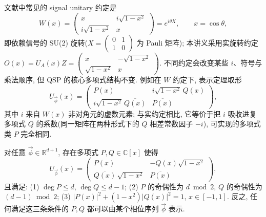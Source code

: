 \documentclass[utf8]{article} %
\numberwithin{equation}{section}   %
\newtheorem{Thm}{\hskip 2em {\color{blue} 定理}}[subsection]
\newtheorem{Note}{\hskip 2em {\color{red} 注}}[subsection]
\begin{document}
\begin{Note}
    文献中常见的 signal unitary 约定是
    \begin{equation}
        W(x) = \begin{pmatrix} x & i\sqrt{1-x^2} \\ i\sqrt{1-x^2} & x \end{pmatrix}
        = e^{i\theta X}, \qquad x = \cos\theta,
    \end{equation}
    即依赖信号的 SU(2) 旋转($X = \begin{pmatrix} 0 & 1 \\ 1 & 0 \end{pmatrix}$ 为 Pauli 矩阵);
    本讲义采用实旋转约定 $O(x) = U_A(x)Z = \begin{pmatrix} x & -\sqrt{1-x^2} \\ \sqrt{1-x^2} & x \end{pmatrix}$.
    不同约定会改变某些 $i$、符号与乘法顺序, 但 QSP 的核心多项式结构不变.
    例如在 $W$ 约定下, 表示定理取形
    \begin{equation}
        U_{\vec\phi}(x) = \begin{pmatrix} P(x) & i\sqrt{1-x^2}\,Q(x) \\
            i\sqrt{1-x^2}\,\overline{Q(x)} & \overline{P(x)} \end{pmatrix},
    \end{equation}
    其中 $i$ 来自 $W(x)$ 非对角元的虚数元素; 与实约定相比, 它等价于把 $i$ 吸收进复多项式
    $Q$ 的系数(同一矩阵在两种形式下的 $Q$ 相差常数因子 $-i$), 可实现的多项式类 $P$ 完全相同.
\end{Note}

\begin{Thm}
    对任意 $\vec\phi \in \mathbb{R}^{d+1}$, 存在多项式 $P, Q \in \mathbb{C}[x]$ 使得
    \begin{equation}
        U_{\vec\phi}(x) = \begin{pmatrix}
            P(x) & -Q(x)\sqrt{1-x^2} \\
            \overline{Q(x)}\,\sqrt{1-x^2} & \overline{P(x)}
        \end{pmatrix},
    \end{equation}
    且满足: (1) $\deg P \le d$, $\deg Q \le d-1$;
    (2) $P$ 的奇偶性为 $d \bmod 2$, $Q$ 的奇偶性为 $(d-1) \bmod 2$;
    (3) $|P(x)|^2 + (1-x^2)|Q(x)|^2 = 1$, $x \in [-1,1]$.
    反之, 任何满足这三条条件的 $P, Q$ 都可以由某个相位序列 $\vec\phi$ 表示.
\end{Thm}
\end{document}
